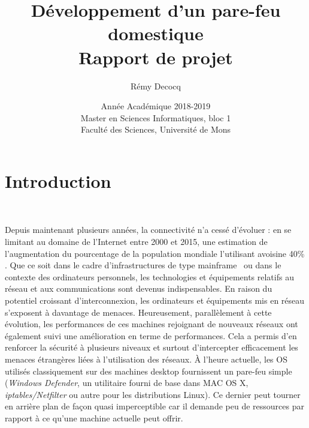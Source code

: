\documentclass[]{article}
\begin{document}
\title{
\vspace{1.6cm}
{\Huge Développement d'un pare-feu domestique}\\
\vspace{0.5cm}
{\Huge Rapport de projet}\\
}



\author{
\vspace{0.9cm}
\huge{Rémy Decocq}
}

\date{
\vspace{8.5cm}
Année Académique 2018-2019\\
Master en Sciences Informatiques, bloc 1\\
Faculté des Sciences, Université de Mons}

\maketitle          

\thispagestyle{empty}   

\newpage

\tableofcontents
\newpage

\section*{Introduction}
~\\
\par Depuis maintenant plusieurs années, la connectivité n'a cessé d'évoluer : en se limitant au domaine de l'Internet entre 2000 et 2015, une estimation de l'augmentation du pourcentage de la population mondiale l'utilisant avoisine 40\%  \cite{IWS} \cite{Cable}. Que ce soit dans le cadre d'infrastructures de type \og mainframe \fg \ ou dans le contexte des ordinateurs personnels, les technologies et équipements relatifs au réseau et aux communications sont devenus indispensables. En raison du potentiel croissant d'interconnexion, les ordinateurs et équipements mis en réseau s'exposent à davantage de menaces. Heureusement, parallèlement à cette évolution, les performances de ces machines rejoignant de nouveaux réseaux ont également suivi une amélioration en terme de performances. Cela a permis d'en renforcer la sécurité à plusieurs niveaux et surtout d'intercepter efficacement les menaces étrangères liées à l'utilisation des réseaux. À l'heure actuelle, les OS utilisés classiquement sur des machines desktop fournissent un pare-feu simple (\textit{Windows Defender}, un utilitaire fourni de base dans MAC OS X, \textit{iptables/Netfilter} ou autre pour les distributions Linux). Ce dernier peut tourner en arrière plan de façon quasi imperceptible car il demande peu de ressources par rapport à ce qu'une machine actuelle peut offrir.\\
\end{document}
